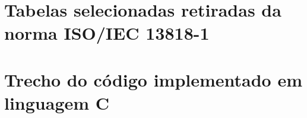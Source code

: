 \documentclass[
	12pt,				%
	openright,			%
	twoside,			%
	a4paper,			%
	brazil,
	french,				%
	english
	]{abntex2}
\begin{document}
%
%


\begin{apendicesenv}

\partapendices

\chapter{Tabelas selecionadas retiradas da norma ISO/IEC 13818-1}


\chapter{Trecho do código implementado em linguagem C}

\end{apendicesenv}



\begin{anexosenv}

\partanexos






\end{anexosenv}

\printindex
\end{document}
